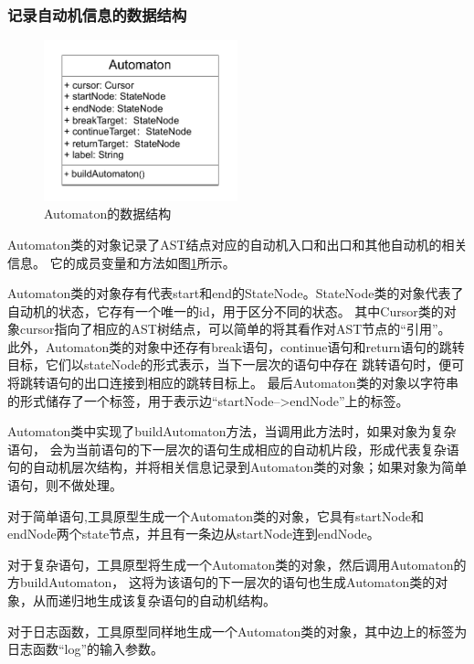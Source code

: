 \subsubsection{记录自动机信息的数据结构}
\begin{figure}[htbp]
	\centering
	\includegraphics[width=0.5\textwidth]{pictures/Automaton的数据结构.pdf}
	\caption{Automaton的数据结构}
	\label{fig:Automaton的数据结构}
\end{figure}


Automaton类的对象记录了AST结点对应的自动机入口和出口和其他自动机的相关信息。
它的成员变量和方法如图\ref{fig:Automaton的数据结构}所示。

Automaton类的对象存有代表start和end的StateNode。StateNode类的对象代表了自动机的状态，它存有一个唯一的id，用于区分不同的状态。
其中Cursor类的对象cursor指向了相应的AST树结点，可以简单的将其看作对AST节点的“引用”。
此外，Automaton类的对象中还存有break语句，continue语句和return语句的跳转目标，它们以stateNode的形式表示，当下一层次的语句中存在
跳转语句时，便可将跳转语句的出口连接到相应的跳转目标上。
最后Automaton类的对象以字符串的形式储存了一个标签，用于表示边“startNode-->endNode”上的标签。

Automaton类中实现了buildAutomaton方法，当调用此方法时，如果对象为复杂语句，
会为当前语句的下一层次的语句生成相应的自动机片段，形成代表复杂语句的自动机层次结构，并将相关信息记录到Automaton类的对象；如果对象为简单语句，则不做处理。

对于简单语句,工具原型生成一个Automaton类的对象，它具有startNode和endNode两个state节点，并且有一条边从startNode连到endNode。

对于复杂语句，工具原型将生成一个Automaton类的对象，然后调用Automaton的方buildAutomaton，
这将为该语句的下一层次的语句也生成Automaton类的对象，从而递归地生成该复杂语句的自动机结构。

对于日志函数，工具原型同样地生成一个Automaton类的对象，其中边上的标签为日志函数“log”的输入参数。




